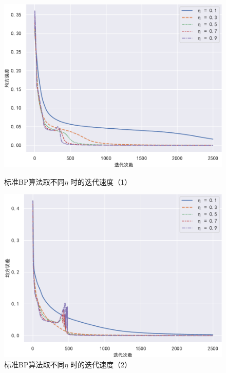 \documentclass{ctexart}
\begin{document}
	\begin{figure}[!htb]
		\centering
		\begin{minipage}{0.49\linewidth}
			\centering
			\includegraphics[width=\textwidth]{../image/标准BP抖动1.pdf}
			\caption{标准BP算法取不同$\eta$ 时的迭代速度（1）}
			\label{标准1}%
		\end{minipage}
		\begin{minipage}{0.49\linewidth}
			\centering
			\includegraphics[width=\textwidth]{../image/标准BP抖动2.pdf}
			\caption{标准BP算法取不同$\eta$ 时的迭代速度（2）}
			\label{标准2}%
		\end{minipage}
		

\end{figure}
\end{document}
